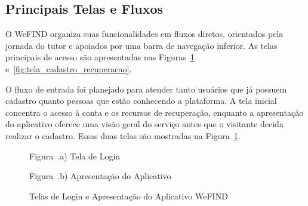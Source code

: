 \subsection{Principais Telas e Fluxos}

O WeFIND organiza suas funcionalidades em fluxos diretos, orientados pela jornada do tutor e apoiados por uma barra de navegação inferior. As telas principais de acesso são apresentadas nas Figuras~\ref{fig:telas_autenticacao} e~\ref{fig:tela_cadastro_recuperacao}.

O fluxo de entrada foi planejado para atender tanto usuários que já possuem cadastro quanto pessoas que estão conhecendo a plataforma. A tela inicial concentra o acesso à conta e os recursos de recuperação, enquanto a apresentação do aplicativo oferece uma visão geral do serviço antes que o visitante decida realizar o cadastro. Essas duas telas são mostradas na Figura~\ref{fig:telas_autenticacao}.

\begin{figure}[H]
    \centering
    \caption{Telas de Login e Apresentação do Aplicativo WeFIND}
    \label{fig:telas_autenticacao}
    \vspace{0.15cm}
    \begin{minipage}[t]{0.48\textwidth}
        \centering
        \par\vspace{0.15cm}
        {\small Figura~\thefigure.a) Tela de Login}
    \end{minipage}
    \hfill
    \begin{minipage}[t]{0.48\textwidth}
        \centering
        \par\vspace{0.15cm}
        {\small Figura~\thefigure.b) Apresentação do Aplicativo}
    \end{minipage}
    \par\vspace{0.15cm}
\end{figure}

